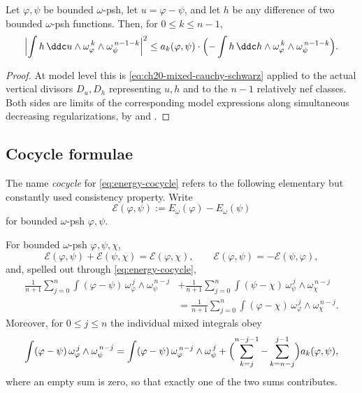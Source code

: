 \begin{corollary}
\label{cor:ch26-cauchy-schwarz}
Let $\varphi,\psi$ be bounded $\omega$-psh, let $u=\varphi-\psi$, and
let $h$ be any difference of two bounded $\omega$-psh functions.  Then,
for $0\leq k\leq n-1$,
\begin{equation}
\label{eq:ch26-cauchy-schwarz}
 \Bigl|\int h\,\ddc u\wedge
    \omega_\varphi^{\,k}\wedge\omega_\psi^{\,n-1-k}\Bigr|^2
 \leq
 a_k(\varphi,\psi)\cdot
 \Bigl(-\int h\,\ddc h\wedge
    \omega_\varphi^{\,k}\wedge\omega_\psi^{\,n-1-k}\Bigr).
\end{equation}
\end{corollary}

\begin{proof}
At model level this is \eqref{eq:ch20-mixed-cauchy-schwarz} applied to the
actual vertical divisors $D_u,D_h$ representing $u,h$ and to the $n-1$
relatively nef classes.  Both sides are limits of the corresponding model
expressions along simultaneous decreasing regularizations, by
 and
.
\end{proof}

\subsection{Cocycle formulae}
\label{sec:ch26-cocycle-formulae}

The name \emph{cocycle} for \eqref{eq:energy-cocycle} refers to the following
elementary but constantly used consistency property.  Write
\[
 \mathcal E(\varphi,\psi):=E_\omega(\varphi)-E_\omega(\psi)
\]
for bounded $\omega$-psh $\varphi,\psi$.

\begin{proposition}
\label{prop:ch26-cocycle-chain}
For bounded $\omega$-psh $\varphi,\psi,\chi$,
\begin{equation}
\label{eq:ch26-cocycle-chain}
 \mathcal E(\varphi,\psi)+\mathcal E(\psi,\chi)
 =\mathcal E(\varphi,\chi),
 \qquad
 \mathcal E(\varphi,\psi)=-\mathcal E(\psi,\varphi),
\end{equation}
and, spelled out through \eqref{eq:energy-cocycle},
\begin{equation}
\label{eq:ch26-cocycle-explicit}
\begin{aligned}
 \frac1{n+1}\sum_{j=0}^n
  \int(\varphi-\psi)\,\omega_\varphi^{\,j}\wedge\omega_\psi^{\,n-j}
 &+\frac1{n+1}\sum_{j=0}^n
  \int(\psi-\chi)\,\omega_\psi^{\,j}\wedge\omega_\chi^{\,n-j}\\
 &=\frac1{n+1}\sum_{j=0}^n
  \int(\varphi-\chi)\,\omega_\varphi^{\,j}\wedge\omega_\chi^{\,n-j}.
\end{aligned}
\end{equation}
Moreover, for $0\leq j\leq n$ the individual mixed integrals obey
\begin{equation}
\label{eq:ch26-mixed-symmetry}
 \int(\varphi-\psi)\,\omega_\varphi^{\,j}\wedge\omega_\psi^{\,n-j}
 =\int(\varphi-\psi)\,\omega_\varphi^{\,n-j}\wedge\omega_\psi^{\,j}
 +\Bigl(\sum_{k=j}^{n-j-1}-\sum_{k=n-j}^{j-1}\Bigr)a_k(\varphi,\psi),
\end{equation}
where an empty sum is zero, so that exactly one of the two sums contributes.
\end{proposition}

